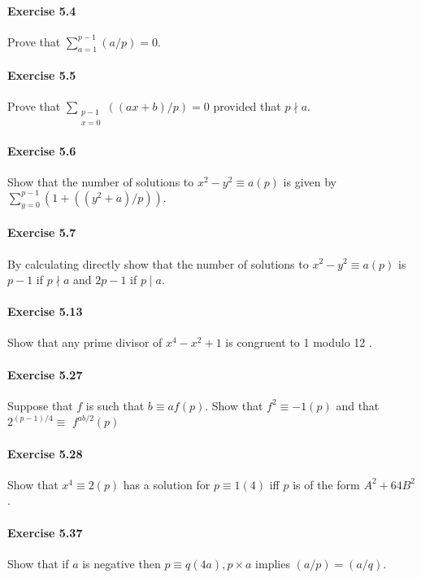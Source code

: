 \documentclass{article}
\begin{document}
\paragraph{Exercise 5.4} Prove that $\sum_{a=1}^{p-1}(a / p)=0$.

\paragraph{Exercise 5.5} Prove that $\sum_{\substack{p-1 \\ x=0}}((a x+b) / p)=0$ provided that $p \nmid a .$

\paragraph{Exercise 5.6} Show that the number of solutions to $x^{2}-y^{2} \equiv a(p)$ is given by $\sum_{y=0}^{p-1}\left(1+\left(\left(y^{2}+a\right) / p\right)\right) .$

\paragraph{Exercise 5.7} By calculating directly show that the number of solutions to $x^{2}-y^{2} \equiv a(p)$ is $p-1$ if $p \nmid a$ and $2 p-1$ if $p \mid a$.

\paragraph{Exercise 5.13} Show that any prime divisor of $x^{4}-x^{2}+1$ is congruent to 1 modulo 12 .

\paragraph{Exercise 5.27} Suppose that $f$ is such that $b \equiv a f(p)$. Show that $f^{2} \equiv-1(p)$ and that $2^{(p-1) / 4} \equiv$ $f^{a b / 2}(p)$

\paragraph{Exercise 5.28} Show that $x^{4} \equiv 2(p)$ has a solution for $p \equiv 1(4)$ iff $p$ is of the form $A^{2}+64 B^{2}$.

\paragraph{Exercise 5.37} Show that if $a$ is negative then $p \equiv q(4 a), p \times a$ implies $(a / p)=(a / q)$.
\end{document}
